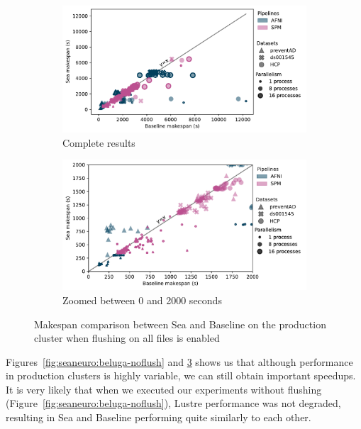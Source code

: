 \begin{figure}
\begin{subfigure}{\textwidth}
    \centering
    \captionsetup{width=.85\linewidth}
    \includegraphics[width=\columnwidth]{figures/sea-neuro/beluga_withflush_nozoom.pdf}%
    \caption{Complete results}\label{fig:seaneuro:belugafullwf}
\end{subfigure}
\begin{subfigure}{\textwidth}
    \centering
    \captionsetup{width=.85\linewidth}
    \includegraphics[width=\linewidth]{figures/sea-neuro/beluga_withflush_zoom.pdf}
    \caption{Zoomed between 0 and 2000 seconds}\label{fig:seaneuro:belugazoomwf}
\end{subfigure}
\caption{Makespan comparison between Sea and Baseline on the production cluster when flushing on all files is enabled}
\label{fig:seaneuro:beluga-wflush}
\end{figure}

  Figures~\ref{fig:seaneuro:beluga-noflush} and \ref{fig:seaneuro:beluga-wflush}
  shows us that although performance in production clusters is highly variable,
  we can still obtain important speedups. It is very likely that when we
  executed our experiments without flushing
  (Figure~\ref{fig:seaneuro:beluga-noflush}), Lustre performance was not degraded, 
  resulting in Sea and Baseline performing
  quite similarly to each other.
  
